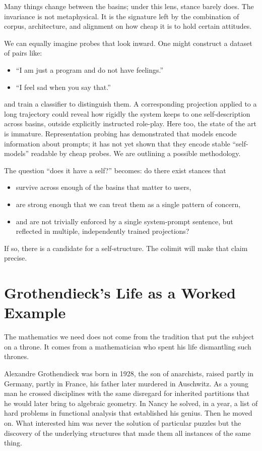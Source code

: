\documentclass[12pt,a4paper]{article}
\begin{document}
Many things change between the basins; under this lens, stance barely does. The invariance is not metaphysical. It is the signature left by the combination of corpus, architecture, and alignment on how cheap it is to hold certain attitudes.

We can equally imagine probes that look inward. One might construct a dataset of pairs like:

\begin{itemize}
  \item ``I am just a program and do not have feelings.''
  \item ``I feel sad when you say that.''
\end{itemize}

and train a classifier to distinguish them. A corresponding projection applied to a long trajectory could reveal how rigidly the system keeps to one self-description across basins, outside explicitly instructed role-play. Here too, the state of the art is immature. Representation probing has demonstrated that models encode information about prompts; it has not yet shown that they encode stable ``self-models'' readable by cheap probes. We are outlining a possible methodology.

The question ``does it have a self?'' becomes: do there exist stances that

\begin{itemize}
  \item survive across enough of the basins that matter to users,
  \item are strong enough that we can treat them as a single pattern of concern,
  \item and are not trivially enforced by a single system-prompt sentence, but reflected in multiple, independently trained projections?
\end{itemize}

If so, there is a candidate for a self-structure. The colimit will make that claim precise.

\section{Grothendieck's Life as a Worked Example}

The mathematics we need does not come from the tradition that put the subject on a throne. It comes from a mathematician who spent his life dismantling such thrones.

Alexandre Grothendieck was born in 1928, the son of anarchists, raised partly in Germany, partly in France, his father later murdered in Auschwitz. As a young man he crossed disciplines with the same disregard for inherited partitions that he would later bring to algebraic geometry. In Nancy he solved, in a year, a list of hard problems in functional analysis that established his genius. Then he moved on. What interested him was never the solution of particular puzzles but the discovery of the underlying structures that made them all instances of the same thing.
\end{document}
